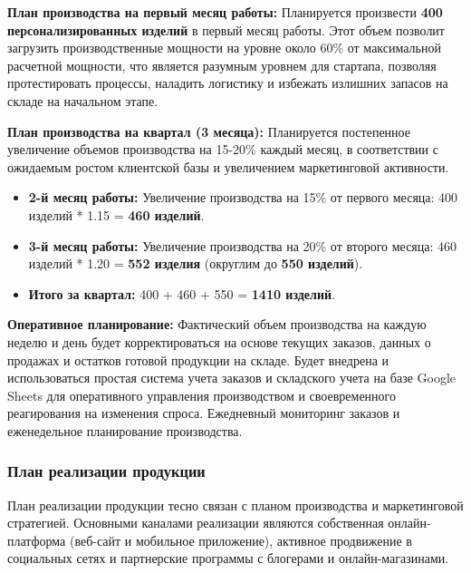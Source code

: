 \vspace{0.3cm}

\textbf{План производства на первый месяц работы:}  Планируется произвести \textbf{400 персонализированных изделий} в первый месяц работы.  Этот объем позволит загрузить производственные мощности на уровне около 60\% от максимальной расчетной мощности, что является разумным уровнем для стартапа, позволяя протестировать процессы, наладить логистику и избежать излишних запасов на складе на начальном этапе.

\vspace{0.3cm}

\textbf{План производства на квартал (3 месяца):}  Планируется постепенное увеличение объемов производства на 15-20\% каждый месяц, в соответствии с ожидаемым ростом клиентской базы и увеличением маркетинговой активности.

\begin{itemize}[noitemsep]
    \item \textbf{2-й месяц работы:} Увеличение производства на 15\% от первого месяца: 400 изделий * 1.15 = \textbf{460 изделий}.
    \item \textbf{3-й месяц работы:} Увеличение производства на 20\% от второго месяца: 460 изделий * 1.20 = \textbf{552 изделия} (округлим до \textbf{550 изделий}).
    \item \textbf{Итого за квартал:} 400 + 460 + 550 = \textbf{1410 изделий}.
\end{itemize}

\textbf{Оперативное планирование:}  Фактический объем производства на каждую неделю и день будет корректироваться на основе текущих заказов, данных о продажах и остатков готовой продукции на складе.  Будет внедрена и использоваться простая система учета заказов и складского учета на базе Google Sheets для оперативного управления производством и своевременного реагирования на изменения спроса.  Ежедневный мониторинг заказов и еженедельное планирование производства.

\subsubsection{План реализации продукции}

План реализации продукции тесно связан с планом производства и маркетинговой стратегией.  Основными каналами реализации являются собственная онлайн-платформа (веб-сайт и мобильное приложение), активное продвижение в социальных сетях и партнерские программы с блогерами и онлайн-магазинами.

